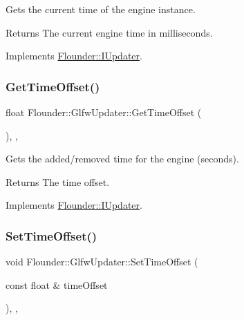 Gets the current time of the engine instance. 

\begin{DoxyReturn}{Returns}
The current engine time in milliseconds. 
\end{DoxyReturn}


Implements \hyperlink{class_flounder_1_1_i_updater_a0eb42ac0880b7aedca1de356a677d197}{Flounder\+::\+I\+Updater}.

\mbox{\label{class_flounder_1_1_glfw_updater_a226e133e14bd058d07e0d19003371c0d}} 
\subsubsection{\texorpdfstring{Get\+Time\+Offset()}{GetTimeOffset()}}
{\footnotesize\ttfamily float Flounder\+::\+Glfw\+Updater\+::\+Get\+Time\+Offset (\begin{DoxyParamCaption}{ }\end{DoxyParamCaption})\hspace{0.3cm}{\ttfamily [inline]}, {\ttfamily [override]}, {\ttfamily [virtual]}}



Gets the added/removed time for the engine (seconds). 

\begin{DoxyReturn}{Returns}
The time offset. 
\end{DoxyReturn}


Implements \hyperlink{class_flounder_1_1_i_updater_a5cf09c1bdf1169168f08a0ac1a98b85f}{Flounder\+::\+I\+Updater}.

\mbox{\label{class_flounder_1_1_glfw_updater_add7ecb2ba97449eb4b2de6e86a48c1a8}} 
\subsubsection{\texorpdfstring{Set\+Time\+Offset()}{SetTimeOffset()}}
{\footnotesize\ttfamily void Flounder\+::\+Glfw\+Updater\+::\+Set\+Time\+Offset (\begin{DoxyParamCaption}\item[{const float \&}]{time\+Offset }\end{DoxyParamCaption})\hspace{0.3cm}{\ttfamily [inline]}, {\ttfamily [override]}, {\ttfamily [virtual]}}



